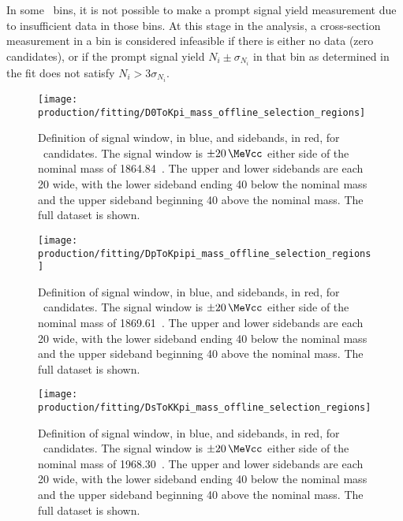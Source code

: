 In some \pTy\ bins, it is not possible to make a prompt signal yield 
measurement due to insufficient data in those bins.
At this stage in the analysis, a cross-section measurement in a bin is 
considered infeasible if there is either no data (zero candidates), or if the 
prompt signal yield $N_{i} \pm \sigma_{N_{i}}$ in that bin as determined in the 
fit does not satisfy $N_{i} > 3\sigma_{N_{i}}$.

\begin{figure}
  \centering
  \texttt{[image: production/fitting/D0ToKpi\_mass\_offline\_selection\_regions]}
  \caption{%
    Definition of signal window, in blue, and sidebands, in red, for \DzToKpi\ 
    candidates.
    The signal window is $\pm\SI{20}{\MeVcc}$ either side of the nominal 
    \PDzero mass of \SI{1864.84}{\MeVcc}~\cite{PDG2014}.
    The upper and lower sidebands are each \SI{20}{\MeVcc} wide, with the lower 
    sideband ending \SI{40}{\MeVcc} below the nominal \PDzero mass and the 
    upper sideband beginning \SI{40}{\MeVcc} above the nominal \PDzero mass.
    The full dataset is shown.
  }
  \label{fig:prod:fitting:regions:D0ToKpi}
\end{figure}

\begin{figure}
  \centering
  \texttt{[image: production/fitting/DpToKpipi\_mass\_offline\_selection\_regions]}
  \caption{%
    Definition of signal window, in blue, and sidebands, in red, for 
    \DpToKpipi\ candidates.
    The signal window is $\pm\SI{20}{\MeVcc}$ either side of the nominal 
    \PDplus mass of \SI{1869.61}{\MeVcc}~\cite{PDG2014}.
    The upper and lower sidebands are each \SI{20}{\MeVcc} wide, with the lower 
    sideband ending \SI{40}{\MeVcc} below the nominal \PDplus mass and the 
    upper sideband beginning \SI{40}{\MeVcc} above the nominal \PDplus mass.
    The full dataset is shown.
  }
  \label{fig:prod:fitting:regions:DpToKpipi}
\end{figure}

\begin{figure}
  \centering
  \texttt{[image: production/fitting/DsToKKpi\_mass\_offline\_selection\_regions]}
  \caption{%
    Definition of signal window, in blue, and sidebands, in red, for 
    \DspTophipi\ candidates.
    The signal window is $\pm\SI{20}{\MeVcc}$ either side of the nominal 
    \PDsplus mass of \SI{1968.30}{\MeVcc}~\cite{PDG2014}.
    The upper and lower sidebands are each \SI{20}{\MeVcc} wide, with the lower 
    sideband ending \SI{40}{\MeVcc} below the nominal \PDsplus mass and the 
    upper sideband beginning \SI{40}{\MeVcc} above the nominal \PDsplus mass.
    The full dataset is shown.
  }
  \label{fig:prod:fitting:regions:DsToKKpi}
\end{figure}

